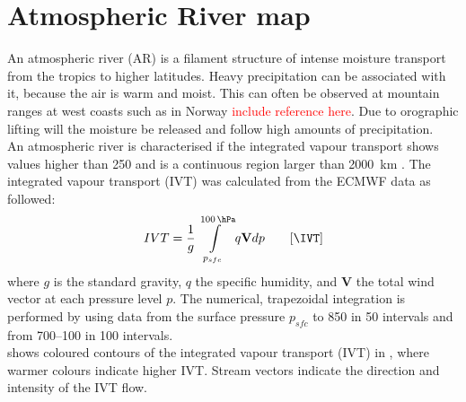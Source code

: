 \section{Atmospheric River map}
\label{sec:atm_riv}

An atmospheric river (AR) is a filament structure of intense moisture transport from the tropics to higher latitudes. 
Heavy precipitation can be associated with it, because the air is warm and moist. This can often be observed at mountain ranges at west coasts such as in Norway \textcolor{red}{include reference here}. Due to orographic lifting will the moisture be released and follow high amounts of precipitation.  
\\
An atmospheric river is characterised if the integrated vapour transport shows values higher than \SI{250}{\IVT} and is a continuous region larger than \SI{2000}{\km} \citep{rutz_climatological_2014}.
The integrated vapour transport (IVT) was calculated from the ECMWF data as followed:
\begin{align}
IVT = \frac{1}{g} \int\limits_{p_{sfc}}^{\SI{100}{\hPa}} q \mathbf{V} dp \qquad [\SI{}{\IVT}]
\label{eq:IVT}
\end{align} 
where $g$ is the standard gravity, $q$ the specific humidity, and $\mathbf{V}$ the total wind vector at each pressure level $p$. The numerical, trapezoidal integration is performed by using data from the surface pressure $p_{sfc}$ to \SI{850}{\hPa} in \SI{50}{\hPa} intervals and from \SIrange{700}{100}{\hPa} in \SI{100}{\hPa} intervals.
\\
 shows coloured contours of the integrated vapour transport (IVT) in \SI{}{\IVT}, where warmer colours indicate higher IVT. Stream vectors indicate the direction and intensity of the IVT flow.

%

